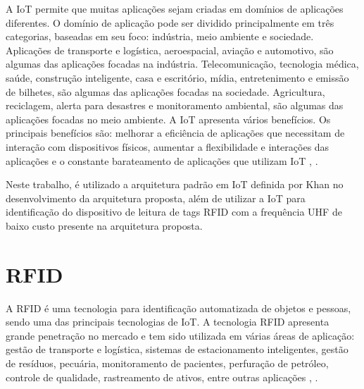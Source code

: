 
A \acrshort{IoT} permite que muitas aplicações sejam criadas em domínios de aplicações diferentes. O domínio de aplicação pode ser dividido principalmente em três categorias, baseadas em seu foco: indústria, meio ambiente e sociedade. Aplicações de transporte e logística, aeroespacial, aviação e automotivo, são algumas das aplicações focadas na indústria. Telecomunicação, tecnologia médica, saúde, construção inteligente, casa e escritório, mídia, entretenimento e emissão de bilhetes, são algumas das aplicações focadas na sociedade. Agricultura, reciclagem, alerta para desastres e monitoramento ambiental, são algumas das aplicações focadas no meio ambiente. A \acrshort{IoT} apresenta vários benefícios. Os principais benefícios são: melhorar a eficiência de aplicações que necessitam de interação com dispositivos físicos, aumentar a flexibilidade e interações das aplicações e o constante barateamento de aplicações que utilizam \acrshort{IoT} \cite{Perera2014}, \cite{Khan2012}.

Neste trabalho, é utilizado a arquitetura padrão em \acrshort{IoT} definida por Khan \cite{Khan2012} no desenvolvimento da arquitetura proposta, além de utilizar a \acrshort{IoT} para identificação do dispositivo de leitura de tags \acrshort{RFID} com a frequência \acrshort{UHF} de baixo custo presente na arquitetura proposta.

\section{RFID}
\label{sec:rfid}




A \acrshort{RFID} é uma tecnologia para identificação automatizada de objetos e pessoas, sendo uma das principais tecnologias de \acrshort{IoT}. A tecnologia \acrshort{RFID} apresenta grande penetração no mercado e tem sido utilizada em várias áreas de aplicação: gestão de transporte e logística, sistemas de estacionamento inteligentes, gestão de resíduos, pecuária, monitoramento de pacientes, perfuração de petróleo, controle de qualidade, rastreamento de ativos, entre outras aplicações \cite{Juels2006RFIDSurvey}, \cite{Tsiropoulou2017RFID-basedSystem}.

